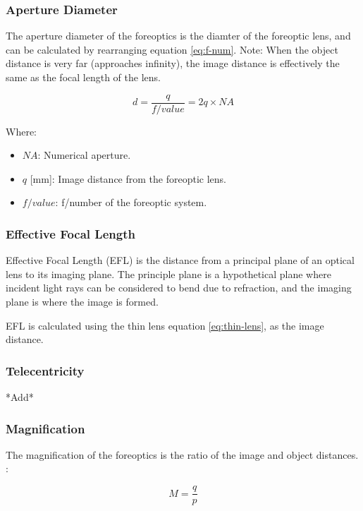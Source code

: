 \documentclass{article}
\begin{document}
\subsubsection{Aperture Diameter}
The aperture diameter of the foreoptics is the diamter of the foreoptic lens, and can be calculated by rearranging equation \ref{eq:f-num}. Note: When the object distance is very far (approaches infinity), the image distance is effectively the same as the focal length of the lens.

\begin{equation} \label{eq:aperture-diameter}
    d=\frac{q}{f/value}=2q\times NA
\end{equation}

Where:
\begin{itemize}[label={}]
    \item $NA$: Numerical aperture.
    \item $q$ [\si{\mm}]: Image distance from the foreoptic lens.
    \item $f/value$: f/number of the foreoptic system.
\end{itemize}

\subsubsection{Effective Focal Length}
Effective Focal Length (EFL) is the distance from a principal plane of an optical lens to its imaging plane. The principle plane is a hypothetical plane where incident light rays can be considered to bend due to refraction, and the imaging plane is where the image is formed\cite{Edmund_lens_geometries}.

EFL is calculated using the thin lens equation \ref{eq:thin-lens}, as the image distance.

\subsubsection{Telecentricity}
*Add*

\subsubsection{Magnification}
The magnification of the foreoptics is the ratio of the image and object distances. \cite{Horiba_entrance_optics}:

\begin{equation} \label{eq:foreoptics-magnification}
    M = \frac{q}{p}
\end{equation}
\end{document}
